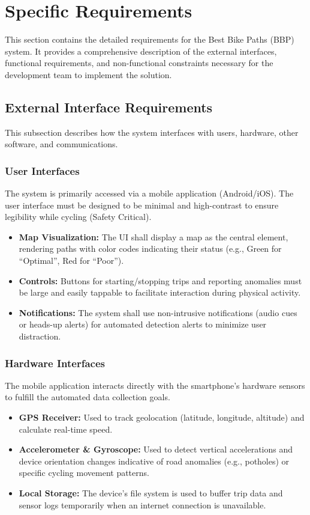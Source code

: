 \section{Specific Requirements}
This section contains the detailed requirements for the Best Bike Paths (BBP) system. It provides a comprehensive description of the external interfaces, functional requirements, and non-functional constraints necessary for the development team to implement the solution.

\subsection{External Interface Requirements}
This subsection describes how the system interfaces with users, hardware, other software, and communications.

\subsubsection{User Interfaces}
The system is primarily accessed via a mobile application (Android/iOS). The user interface must be designed to be minimal and high-contrast to ensure legibility while cycling (Safety Critical).

\begin{itemize}
    \item \textbf{Map Visualization:} The UI shall display a map as the central element, rendering paths with color codes indicating their status (e.g., Green for ``Optimal'', Red for ``Poor'').
    \item \textbf{Controls:} Buttons for starting/stopping trips and reporting anomalies must be large and easily tappable to facilitate interaction during physical activity.
    \item \textbf{Notifications:} The system shall use non-intrusive notifications (audio cues or heads-up alerts) for automated detection alerts to minimize user distraction.
\end{itemize}

\subsubsection{Hardware Interfaces}
The mobile application interacts directly with the smartphone's hardware sensors to fulfill the automated data collection goals.

\begin{itemize}
    \item \textbf{GPS Receiver:} Used to track geolocation (latitude, longitude, altitude) and calculate real-time speed.
    \item \textbf{Accelerometer \& Gyroscope:} Used to detect vertical accelerations and device orientation changes indicative of road anomalies (e.g., potholes) or specific cycling movement patterns.
    \item \textbf{Local Storage:} The device's file system is used to buffer trip data and sensor logs temporarily when an internet connection is unavailable.
\end{itemize}

